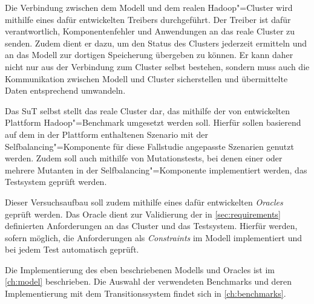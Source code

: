 Die Verbindung zwischen dem Modell und dem realen Hadoop"=Cluster wird mithilfe eines dafür entwickelten Treibers durchgeführt.
Der Treiber ist dafür verantwortlich, Komponentenfehler und Anwendungen an das reale Cluster zu senden.
Zudem dient er dazu, um den Status des Clusters jederzeit ermitteln und an das Modell zur dortigen Speicherung übergeben zu können.
Er kann daher nicht nur aus der Verbindung zum Cluster selbst bestehen, sondern muss auch die Kommunikation zwischen Modell und Cluster sicherstellen und übermittelte Daten entsprechend umwandeln.

Das \ac{SuT} selbst stellt das reale Cluster dar, das mithilfe der von \citeauthor{zhang2016} entwickelten Plattform Hadoop"=Benchmark umgesetzt werden soll.
Hierfür sollen basierend auf dem in der Plattform enthaltenen Szenario mit der Selfbalancing"=Komponente für diese Fallstudie angepasste Szenarien genutzt werden.
Zudem soll auch mithilfe von Mutationstests, bei denen einer oder mehrere Mutanten in der Selfbalancing"=Komponente implementiert werden, das Testsystem geprüft werden.

Dieser Versuchsaufbau soll zudem mithilfe eines dafür entwickelten \emph{Oracles} geprüft werden.
Das Oracle dient zur Validierung der in \autoref{sec:requirements} definierten Anforderungen an das Cluster und das Testsystem.
Hierfür werden, sofern möglich, die Anforderungen als \emph{Constraints} im Modell implementiert und bei jedem Test automatisch geprüft.

Die Implementierung des eben beschriebenen Modells und Oracles ist im \autoref{ch:model} beschrieben.
Die Auswahl der verwendeten Benchmarks und deren Implementierung mit dem Transitionssystem findet sich in \autoref{ch:benchmarks}.
